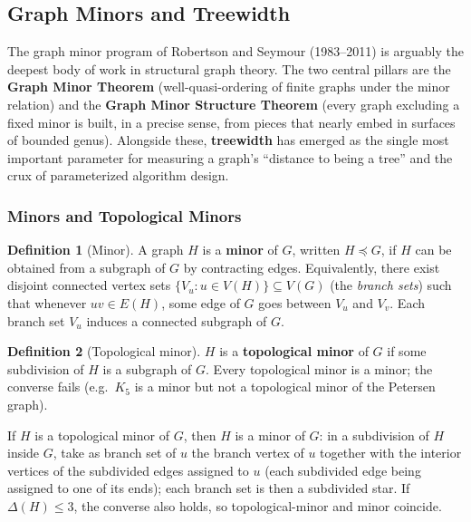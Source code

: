 \documentclass{article}
\theoremstyle{definition}
\newtheorem{definition}{Definition}
\begin{document}
\subsection{Graph Minors and Treewidth}

The graph minor program of Robertson and Seymour (1983--2011) is
arguably the deepest body of work in structural graph theory. The
two central pillars are the \textbf{Graph Minor Theorem}
(well-quasi-ordering of finite graphs under the minor relation) and
the \textbf{Graph Minor Structure Theorem} (every graph excluding a
fixed minor is built, in a precise sense, from pieces that nearly embed
in surfaces of bounded genus). Alongside these,
\textbf{treewidth} has emerged as the single most important
parameter for measuring a graph's ``distance to being a tree'' and
the crux of parameterized algorithm design.

\subsubsection{Minors and Topological Minors}

\begin{definition}[Minor]\label{def:minor}
A graph $H$ is a \textbf{minor} of $G$, written $H \preceq G$, if $H$
can be obtained from a subgraph of $G$ by contracting edges.
Equivalently, there exist disjoint connected vertex sets
$\{V_u : u \in V(H)\} \subseteq V(G)$ (the \emph{branch sets}) such
that whenever $uv \in E(H)$, some edge of $G$ goes between $V_u$ and
$V_v$. Each branch set $V_u$ induces a connected subgraph of $G$.
\end{definition}

\begin{definition}[Topological minor]
$H$ is a \textbf{topological minor} of $G$ if some subdivision of $H$
is a subgraph of $G$. Every topological minor is a minor; the converse
fails (e.g.\ $K_5$ is a minor but not a topological minor of the
Petersen graph).
\end{definition}

\begin{proposition}
If $H$ is a topological minor of $G$, then $H$ is a minor of $G$: in a
subdivision of $H$ inside $G$, take as branch set of $u$ the branch vertex
of $u$ together with the interior vertices of the subdivided edges assigned
to $u$ (each subdivided edge being assigned to one of its ends); each branch
set is then a subdivided star. If $\Delta(H) \le 3$, the converse also holds,
so topological-minor and minor coincide.
\end{proposition}
\end{document}
